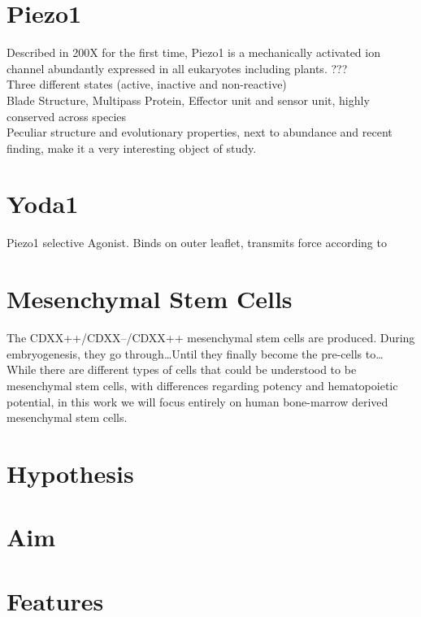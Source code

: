 \section{Piezo1}
Described in 200X for the first time, Piezo1 is a  mechanically activated ion channel abundantly expressed in all eukaryotes including plants. ???\cite{Coste55} \\
Three different states (active, inactive and non-reactive)\\
Blade Structure, Multipass Protein, Effector unit and sensor unit, highly conserved across species\\
Peculiar structure and evolutionary properties, next to abundance and recent finding, make it a very interesting object of study. 

\section{Yoda1}
Piezo1 selective Agonist. Binds on outer leaflet, transmits force according to \cite{BotelloSmith.2019} 

\section{Mesenchymal Stem Cells}
The CDXX++/CDXX--/CDXX++ mesenchymal stem cells are produced. During embryogenesis, they go through\dots Until they finally become the pre-cells to\dots 
While there are different types of cells that could be understood to be mesenchymal stem cells, with differences regarding potency and hematopoietic potential, in this work we will focus entirely on human bone-marrow derived mesenchymal stem cells. 


\section{Hypothesis}

\section{Aim}

\section{Features}
\label{sec:features}

